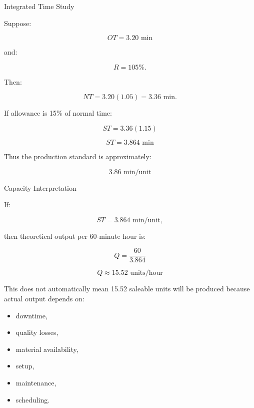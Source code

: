 \documentclass[aspectratio=169,10pt]{beamer}
\begin{document}
\begin{frame}[shrink=18]{Integrated Time Study}
\small

Suppose:

\[
OT=3.20\text{ min}
\]

and:

\[
R=105\%.
\]

Then:

\[
NT=3.20(1.05)=3.36\text{ min}.
\]

If allowance is 15\% of normal time:

\[
ST=3.36(1.15)
\]

\[
\boxed{
ST=3.864\text{ min}
}
\]

Thus the production standard is approximately:

\[
\boxed{
3.86\text{ min/unit}
}
\]

\end{frame}


\begin{frame}[shrink=18]{Capacity Interpretation}
\small

If:

\[
ST=3.864\text{ min/unit},
\]

then theoretical output per 60-minute hour is:

\[
Q=
\frac{60}{3.864}
\]

\[
\boxed{
Q\approx15.52\text{ units/hour}
}
\]

This does not automatically mean 15.52 saleable units will be
produced because actual output depends on:

\begin{itemize}
    \item downtime,
    \item quality losses,
    \item material availability,
    \item setup,
    \item maintenance,
    \item scheduling.
\end{itemize}

\end{frame}

\end{document}
